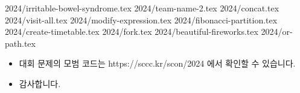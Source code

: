     {2024/irritable-bowel-syndrome.tex}
    {2024/team-name-2.tex}
    {2024/concat.tex}
    {2024/visit-all.tex}
    {2024/modify-expression.tex}
    {2024/fibonacci-partition.tex}
    {2024/create-timetable.tex}
    {2024/fork.tex}
    {2024/beautiful-fireworks.tex}
    {2024/or-path.tex}
    
    \begin{frame} %
        \begin{itemize}
            \item 대회 문제의 모범 코드는 https://sccc.kr/scon/2024 에서 확인할 수 있습니다.
            \item 감사합니다.
        \end{itemize}
    \end{frame}

